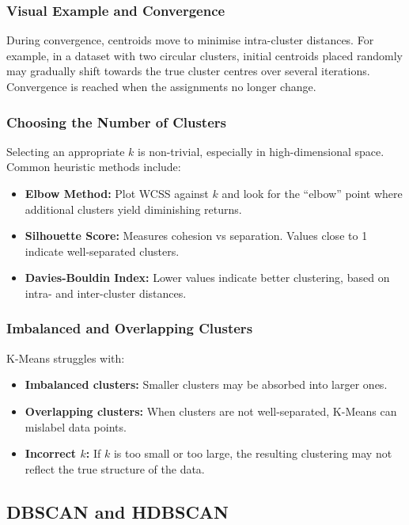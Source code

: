 \documentclass[9pt]{extarticle}
\begin{document}
\subsubsection{Visual Example and Convergence}

During convergence, centroids move to minimise intra-cluster distances. For example, in a dataset with two circular clusters, initial centroids placed randomly may gradually shift towards the true cluster centres over several iterations. Convergence is reached when the assignments no longer change.

\subsubsection{Choosing the Number of Clusters}

Selecting an appropriate $k$ is non-trivial, especially in high-dimensional space. Common heuristic methods include:

\begin{itemize}
    \item \textbf{Elbow Method:} Plot WCSS against $k$ and look for the “elbow” point where additional clusters yield diminishing returns.
    \item \textbf{Silhouette Score:} Measures cohesion vs separation. Values close to 1 indicate well-separated clusters.
    \item \textbf{Davies-Bouldin Index:} Lower values indicate better clustering, based on intra- and inter-cluster distances.
\end{itemize}

\subsubsection{Imbalanced and Overlapping Clusters}

K-Means struggles with:
\begin{itemize}
    \item \textbf{Imbalanced clusters:} Smaller clusters may be absorbed into larger ones.
    \item \textbf{Overlapping clusters:} When clusters are not well-separated, K-Means can mislabel data points.
    \item \textbf{Incorrect $k$:} If $k$ is too small or too large, the resulting clustering may not reflect the true structure of the data.
\end{itemize}


\subsection{DBSCAN and HDBSCAN}
\end{document}
